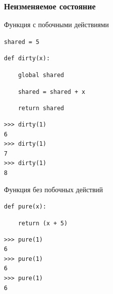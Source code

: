 \documentclass{beamer}
\begin{document}
\begin{frame}[fragile]
  \frametitle{Неизменяемое состояние}
  \begin{minipage}[t]{130px}
    Функция с побочными действиями
    \begin{block}{}
      \texttt{shared = 5}

      \texttt{{\color{magenta}def} {\color{blue}dirty}(x):}

      \verb+    +\texttt{{\color{magenta}global} shared}

      \verb+    +\texttt{shared = shared + x}

      \verb+    +\texttt{{\color{magenta}return} shared}

    \end{block}
    \pause
    \begin{block}{}
\begin{verbatim}
>>> dirty(1)
6
>>> dirty(1)
7
>>> dirty(1)
8
\end{verbatim}
    \end{block}
  \end{minipage}
  \pause
  \hfill
  \begin{minipage}[t]{130px}
    Функция без побочных действий
    \begin{block}{}
      \texttt{{\color{magenta}def} {\color{blue}pure}(x):}

      \verb+    +\texttt{{\color{magenta}return} (x + 5)}

    \end{block}

    \begin{block}{}
\begin{verbatim}
>>> pure(1)
6
>>> pure(1)
6
>>> pure(1)
6
\end{verbatim}
    \end{block}

  \end{minipage}

\end{frame}
\end{document}

